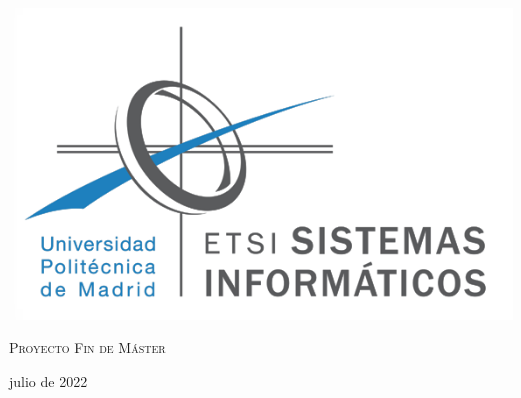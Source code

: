 \begin{titlepage}
  \begin{flushleft}
    \includegraphics[width=.4\linewidth]{images/etsisi.png}
  \end{flushleft}
  \begin{center}
    \vspace*{1cm}

    \Huge
    \Course

    \vspace{2cm}
    \huge
    \Subtitle

    \vspace{2cm}

    \LARGE
    \textsc{Proyecto Fin de Máster}

    \vfill

    \Large
    \textit{\Authors}

    \vspace{0.5cm}

    julio de 2022
  \end{center}
\end{titlepage}
